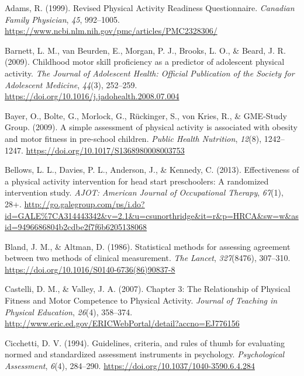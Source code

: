 \documentclass[
  man,
  colorlinks=true,linkcolor=blue,citecolor=blue,urlcolor=blue]{apa7}
\newlength{\cslhangindent}
\newlength{\cslentryspacingunit} %
\newenvironment{CSLReferences}[2] %
 {%
  \setlength{\parindent}{0pt}
  \ifodd #1
  \let\oldpar\par
  \def\par{\hangindent=\cslhangindent\oldpar}
  \fi
  \setlength{\parskip}{#2\cslentryspacingunit}
 }%
 {}
\begin{document}
\hypertarget{refs}{}
\begin{CSLReferences}{1}{0}
\leavevmode{}%
Adams, R. (1999). Revised {Physical Activity Readiness Questionnaire}.
\emph{Canadian Family Physician}, \emph{45}, 992--1005.
\url{https://www.ncbi.nlm.nih.gov/pmc/articles/PMC2328306/}

\leavevmode{}%
Barnett, L. M., van Beurden, E., Morgan, P. J., Brooks, L. O., \& Beard,
J. R. (2009). Childhood motor skill proficiency as a predictor of
adolescent physical activity. \emph{The Journal of Adolescent Health:
Official Publication of the Society for Adolescent Medicine},
\emph{44}(3), 252--259.
\url{https://doi.org/10.1016/j.jadohealth.2008.07.004}

\leavevmode{}%
Bayer, O., Bolte, G., Morlock, G., Rückinger, S., von Kries, R., \&
GME-Study Group. (2009). A simple assessment of physical activity is
associated with obesity and motor fitness in pre-school children.
\emph{Public Health Nutrition}, \emph{12}(8), 1242--1247.
\url{https://doi.org/10.1017/S1368980008003753}

\leavevmode{}%
Bellows, L. L., Davies, P. L., Anderson, J., \& Kennedy, C. (2013).
Effectiveness of a physical activity intervention for head start
preschoolers: A randomized intervention study. \emph{AJOT: American
Journal of Occupational Therapy}, \emph{67}(1), 28+.
\url{http://go.galegroup.com/ps/i.do?id=GALE\%7CA314443342\&v=2.1\&u=csunorthridge\&it=r\&p=HRCA\&sw=w\&asid=9496686804b2cdbe2f7f6b6205138068}

\leavevmode{}%
Bland, J. M., \& Altman, D. (1986). Statistical methods for assessing
agreement between two methods of clinical measurement. \emph{The
Lancet}, \emph{327}(8476), 307--310.
\url{https://doi.org/10.1016/S0140-6736(86)90837-8}

\leavevmode{}%
Castelli, D. M., \& Valley, J. A. (2007). Chapter 3: {The Relationship}
of {Physical Fitness} and {Motor Competence} to {Physical Activity}.
\emph{Journal of Teaching in Physical Education}, \emph{26}(4),
358--374.
\url{http://www.eric.ed.gov/ERICWebPortal/detail?accno=EJ776156}

\leavevmode{}%
Cicchetti, D. V. (1994). Guidelines, criteria, and rules of thumb for
evaluating normed and standardized assessment instruments in psychology.
\emph{Psychological Assessment}, \emph{6}(4), 284--290.
\url{https://doi.org/10.1037/1040-3590.6.4.284}


\end{CSLReferences}
\end{document}
